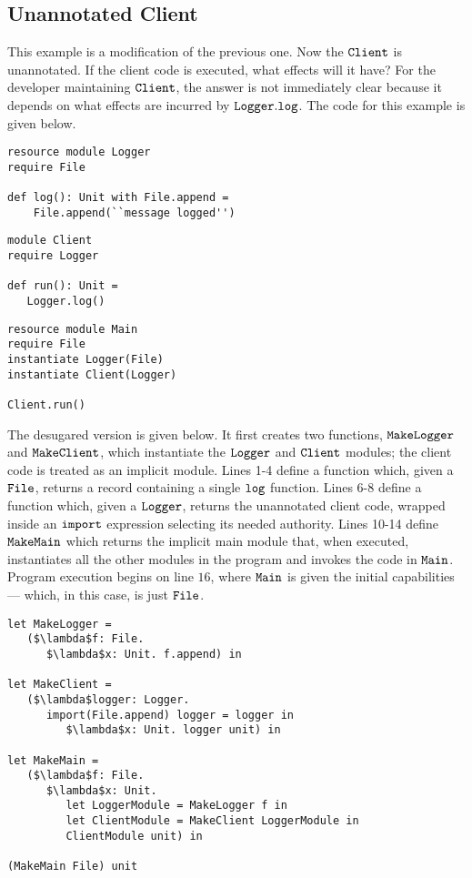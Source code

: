 \subsection{Unannotated Client}

This example is a modification of the previous one. Now the $\mathtt{Client}$ is unannotated. If the client code is executed, what effects will it have? For the developer maintaining $\mathtt{Client}$, the answer is not immediately clear because it depends on what effects are incurred by $\mathtt{Logger.log}$. The code for this example is given below.

\begin{lstlisting}
resource module Logger
require File

def log(): Unit with File.append =
    File.append(``message logged'')
\end{lstlisting}

\begin{lstlisting}
module Client
require Logger

def run(): Unit =
   Logger.log()
\end{lstlisting}

\begin{lstlisting}
resource module Main
require File
instantiate Logger(File)
instantiate Client(Logger)

Client.run()
\end{lstlisting}

The desugared version is given below. It first creates two functions, $\mathtt{MakeLogger}$ and $\mathtt{MakeClient}$, which instantiate the $\mathtt{Logger}$ and $\mathtt{Client}$ modules; the client code is treated as an implicit module. Lines 1-4 define a function which, given a $\mathtt{File}$, returns a record containing a single $\mathtt{log}$ function. Lines 6-8 define a function which, given a $\mathtt{Logger}$, returns the unannotated client code, wrapped inside an $\mathtt{import}$ expression selecting its needed authority. Lines 10-14 define $\mathtt{MakeMain}$ which returns the implicit main module that, when executed, instantiates all the other modules in the program and invokes the code in $\mathtt{Main}$. Program execution begins on line $16$, where $\mathtt{Main}$ is given the initial capabilities --- which, in this case, is just $\mathtt{File}$.

\begin{lstlisting}
let MakeLogger =
   ($\lambda$f: File.
      $\lambda$x: Unit. f.append) in
          
let MakeClient =
   ($\lambda$logger: Logger.
      import(File.append) logger = logger in
         $\lambda$x: Unit. logger unit) in
          
let MakeMain =
   ($\lambda$f: File.
      $\lambda$x: Unit.
         let LoggerModule = MakeLogger f in
         let ClientModule = MakeClient LoggerModule in
         ClientModule unit) in

(MakeMain File) unit
\end{lstlisting}

